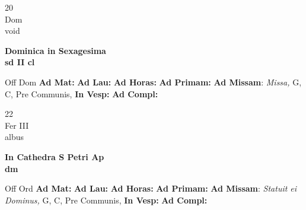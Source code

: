 \documentclass[10pt, openany]{book}
\begin{document}
    \begin{center}
        \begin{minipage}{3.5in}
            \vspace{2em}
            \begin{minipage}{0.5in}
                {\Huge 20} \\
                {\normalsize Dom} \\
                {\normalsize void}
            \end{minipage}
            \begin{minipage}{3.0in}
                \textbf{ \large Dominica in Sexagesima \\
                \textnormal{\normalsize sd II cl}} \\ 
            \end{minipage}
            \begin{justify}Off Dom
                \textbf{Ad Mat: }
                \textbf{Ad Lau: }
                \textbf{Ad Horas: }
                \textbf{Ad Primam: }\textbf{Ad Missam}: \textit{Missa,} G, C, Pre Communis,  
                \textbf{In Vesp: }
                \textbf{Ad Compl: }
            \end{justify}
        \end{minipage}
    \end{center}

    \begin{center}
        \begin{minipage}{3.5in}
            \vspace{2em}
            \begin{minipage}{0.5in}
                {\Huge 22} \\
                {\normalsize Fer III} \\
                {\normalsize albus}
            \end{minipage}
            \begin{minipage}{3.0in}
                \textbf{ \large In Cathedra S Petri Ap \\
                \textnormal{\normalsize dm}} \\ 
            \end{minipage}
            \begin{justify}Off Ord
                \textbf{Ad Mat: }
                \textbf{Ad Lau: }
                \textbf{Ad Horas: }
                \textbf{Ad Primam: }\textbf{Ad Missam}: \textit{Statuit ei Dominus,} G, C, Pre Communis,  
                \textbf{In Vesp: }
                \textbf{Ad Compl: }
            \end{justify}
        \end{minipage}
    \end{center}
\end{document}
